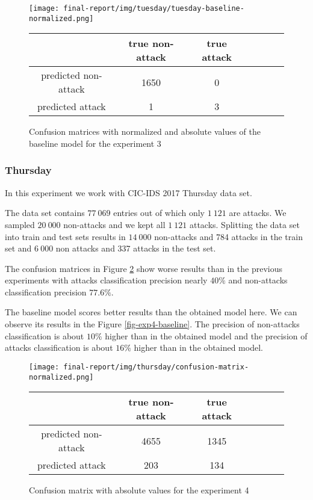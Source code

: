 \documentclass{article}
\begin{document}
\begin{figure}[h!]
    \centering
    \texttt{[image: final-report/img/tuesday/tuesday-baseline-normalized.png]}

    \centering
    \begin{tabular}{ |c|c|c|c|c|c|c| }
     \hline
      & true non-attack & true attack \\
     \hline
     predicted non-attack & 1650 & 0 \\
     \hline
     predicted attack & 1 & 3 \\
     \hline
    \end{tabular}
    \caption{Confusion matrices with normalized and absolute values of the baseline model for the experiment 3}
    \label{fig-exp3-baseline}
\end{figure}

\clearpage


\subsubsection{Thursday}
In this experiment we work with CIC-IDS 2017 Thursday data set.

The data set contains $77\ 069$ entries out of which only $1\ 121$ are attacks. We sampled $20\ 000$ non-attacks and we kept all $1\ 121$ attacks. Splitting the data set into train and test sets results in $14\ 000$ non-attacks and 784 attacks in the train set and $6\ 000$ non attacks and 337 attacks in the test set.

The confusion matrices in Figure \ref{fig-exp4-transcriptions} show worse results than in the previous experiments with attacks classification precision nearly $40\%$ and non-attacks classification precision $77.6\%$.

The baseline model scores better results than the obtained model here. We can observe its results in the Figure \ref{fig-exp4-baseline}. The precision of non-attacks classification is about $10\%$ higher than in the obtained model and the precision of attacks classification is about $16\%$ higher than in the obtained model.


\begin{figure}[h!]
    \centering
    \texttt{[image: final-report/img/thursday/confusion-matrix-normalized.png]}

    \centering
    \begin{tabular}{ |c|c|c|c|c|c|c| }
     \hline
      & true non-attack & true attack \\
     \hline
     predicted non-attack & 4655 & 1345 \\
     \hline
     predicted attack & 203 & 134 \\
     \hline
    \end{tabular}
    \caption{Confusion matrix with absolute values for the experiment 4}
    \label{fig-exp4-transcriptions}
\end{figure}
\end{document}
